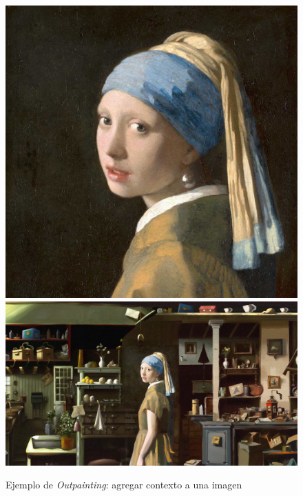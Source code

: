 \documentclass[runningheads]{llncs} %
\begin{document}
\begin{figure}
    \centering
    \includegraphics[scale=0.1]{ej2.1-dalle.jpg}
    \includegraphics[scale=0.1182]{ej2.2-dalle.jpg}
    \caption{Ejemplo de \textit{Outpainting}: agregar contexto a una
    imagen \cite{ej-dalle}}
    \label{fig:dalle-ej2}
\end{figure}
\end{document}
